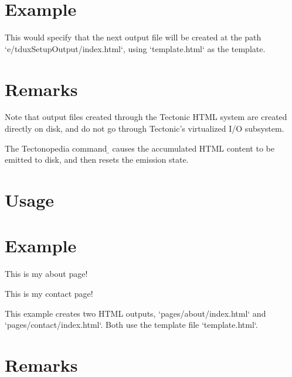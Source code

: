 \section*{Example}

\begin{texdisp}
\end{texdisp}

This would specify that the next output file will be created at the path
\tex`e/tduxSetupOutput/index.html`, using \tex`template.html` as the template.

\section*{Remarks}

Note that output files created through the Tectonic HTML system are created
directly on disk, and do not go through Tectonic’s virtualized I/O subsystem.



The Tectonopedia command \b{\string\tduxEmit} causes the accumulated HTML
content to be emitted to disk, and then resets the emission state.

\section*{Usage}

\begin{texdisp}
\tduxEmit
\end{texdisp}

\section*{Example}

\begin{texdisp}

This is my about page!
\tduxEmit

This is my contact page!
\tduxEmit
\end{texdisp}

This example creates two HTML outputs, \tex`pages/about/index.html` and
\tex`pages/contact/index.html`. Both use the template file \tex`template.html`.

\section*{Remarks}

